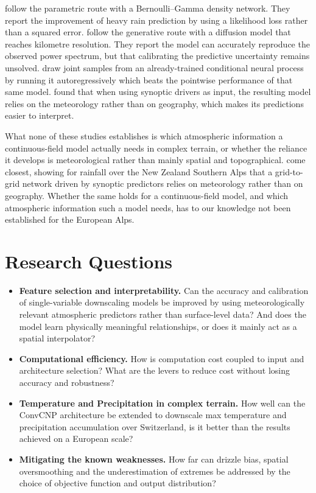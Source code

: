 \textcite{cannon2008berngamma} follow the parametric route with a Bernoulli--Gamma density network. They report the improvement of heavy rain prediction by using a likelihood loss rather than a squared error. \textcite{mardani2025corrdiff} follow the generative route with a diffusion model that reaches kilometre resolution. They report the model can accurately reproduce the observed power spectrum, but that calibrating the predictive uncertainty remains unsolved. \textcite{bruinsma2023arcnp} draw joint samples from an already-trained conditional neural process by running it autoregressively which beats the pointwise performance of that same model. \textcite{rampal2022interpretable} found that when using synoptic drivers as input, the resulting model relies on the meteorology rather than on geography, which makes its predictions easier to interpret. 

What none of these studies establishes is which atmospheric information a continuous-field model actually needs in complex terrain, or whether the reliance it develops is meteorological rather than mainly spatial and topographical. \textcite{rampal2022interpretable} come closest, showing for rainfall over the New Zealand Southern Alps that a grid-to-grid network driven by synoptic predictors relies on meteorology rather than on geography. Whether the same holds for a continuous-field model, and which atmospheric information such a model needs, has to our knowledge not been established for the European Alps.

\section{Research Questions}\label{sec:intro-questions}

\begin{itemize}
    \item \textbf{Feature selection and interpretability.} Can the accuracy and calibration of single-variable downscaling models be improved by using meteorologically relevant atmospheric predictors rather than surface-level data? And does the model learn physically meaningful relationships, or does it mainly act as a spatial interpolator? 
    \item \textbf{Computational efficiency.} How is computation cost coupled to input and architecture selection?
    What are the levers to reduce cost  without losing accuracy and robustness?
    \item \textbf{Temperature and Precipitation in complex terrain.} How well can the ConvCNP architecture be extended to downscale max temperature and precipitation accumulation over Switzerland, is it better than the results \textcite{vaughan2022convcnp} achieved on a European scale?
    \item \textbf{Mitigating the known weaknesses.} How far can drizzle bias, spatial oversmoothing and the underestimation of extremes be addressed by the choice of objective function and output distribution?
\end{itemize}
